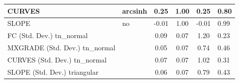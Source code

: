 \begin{table}
\begin{center}
\begin{tabular}{|l|l|c|c|c|l|}
			\hline
			CURVES & arcsinh & 0.25 & 1.00 & 0.25 & 0.80 \\
			\hline
			SLOPE & no & -0.01 & 1.00 & -0.01 & 0.99 \\
			\hline
			FC (Std. Dev.) tn_normal &  & 0.09 & 0.07 & 1.20 & 0.23 \\
			\hline
			MXGRADE (Std. Dev.) tn_normal &  & 0.05 & 0.07 & 0.74 & 0.46 \\
			\hline
			CURVES (Std. Dev.) tn_normal &  & 0.07 & 0.07 & 1.02 & 0.31 \\
			\hline
			SLOPE (Std. Dev.) triangular &  & 0.06 & 0.07 & 0.79 & 0.43 \\
			\hline
		\end{tabular}
	\end{center}
\end{table}